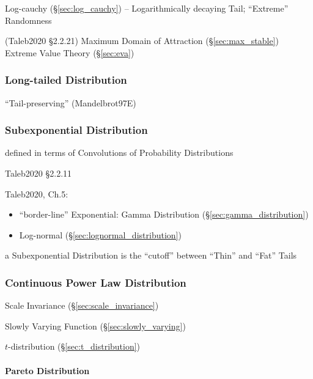 Log-cauchy (\S\ref{sec:log_cauchy}) -- Logarithmically decaying Tail;
``Extreme'' Randomness

(Taleb2020 \S 2.2.21) Maximum Domain of Attraction (\S\ref{sec:max_stable})
\fist Extreme Value Theory (\S\ref{sec:eva})



\subsubsection{Long-tailed Distribution}\label{sec:long_tailed}

``Tail-preserving'' (Mandelbrot97E)



\subsubsection{Subexponential Distribution}
\label{sec:subexponential_distribution}

defined in terms of Convolutions of Probability Distributions

Taleb2020 \S 2.2.11

Taleb2020, Ch.5:

\begin{itemize}
  \item ``border-line'' Exponential: Gamma Distribution
    (\S\ref{sec:gamma_distribution})
  \item Log-normal (\S\ref{sec:lognormal_distribution})
\end{itemize}

a Subexponential Distribution is the ``cutoff'' between ``Thin'' and ``Fat''
Tails



\subsubsection{Continuous Power Law Distribution}
\label{sec:continuous_power_law}

Scale Invariance (\S\ref{sec:scale_invariance})

Slowly Varying Function (\S\ref{sec:slowly_varying})

$t$-distribution (\S\ref{sec:t_distribution})



\paragraph{Pareto Distribution}\label{sec:pareto_distribution}\hfill

